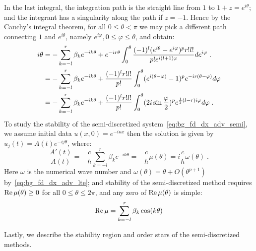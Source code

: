 In the last integral, the integration path is the straight line from $1$ to $1+z=e^{i\theta}$; and the integrant has a singularity along the path if $z=-1$.
Hence by the Cauchy's integral theorem, for all $0\le\theta<\pi$ we may pick a different path connecting $1$ and $e^{i\theta}$, namely $e^{i\varphi}, 0\le\varphi\le\theta$, and obtain:
\begin{align}
  \notag
  i\theta &= -\sum_{k=-l}^r\beta_ke^{-ik\theta}+e^{-ir\theta}\int_0^{\theta}\frac{(-1)^l(e^{i\theta}-e^{i\varphi})^pr!l!}{p!e^{i(l+1)\varphi}}de^{i\varphi}\;. \\
  \notag
  &= -\sum_{k=-l}^r\beta_ke^{-ik\theta}+\frac{(-1)^lr!l!}{p!}\int_0^{\theta}(e^{i(\theta-\varphi)}-1)^pe^{-ir(\theta-\varphi)}d\varphi \\
  \label{eq:bg_fd_dx_adv_semi_symbol}
  &= -\sum_{k=-l}^r\beta_ke^{-ik\theta}+\frac{(-1)^lr!l!}{p!}\int_0^{\theta}(2i\sin\frac{\varphi}{2})^pe^{\frac{1}{2}(l-r)i\varphi}d\varphi\;.
\end{align}
To study the stability of the semi-discretized system~\cref{eq:bg_fd_dx_adv_semi}, we assume initial data $u(x,0)=e^{-i\kappa x}$ then the solution is given by $u_j(t)=A(t)e^{-ij\theta}$, where:
\begin{displaymath}
  \frac{A'(t)}{A(t)} = -\frac{c}{h}\sum_{k=-l}^r\beta_ke^{-ik\theta} = -\frac{c}{h}\mu(\theta) = i\frac{c}{h}\omega(\theta)\;.
\end{displaymath}
Here $\omega$ is the numerical wave number and $\omega(\theta)=\theta+O(\theta^{p+1})$ by~\cref{eq:bg_fd_dx_adv_lte}; and stability of the semi-discretized method requires $\operatorname{Re}\mu(\theta)\ge 0$ for all $0\le \theta\le 2\pi$, and any zero of $\operatorname{Re}\mu(\theta)$ is simple:
\begin{equation}\label{eq:bg_fd_dx_adv_re}
  \operatorname{Re}\mu = \sum_{k=-l}^r\beta_k\cos(k\theta)
\end{equation}

Lastly, we describe the stability region and order stars of the semi-discretized methods.
